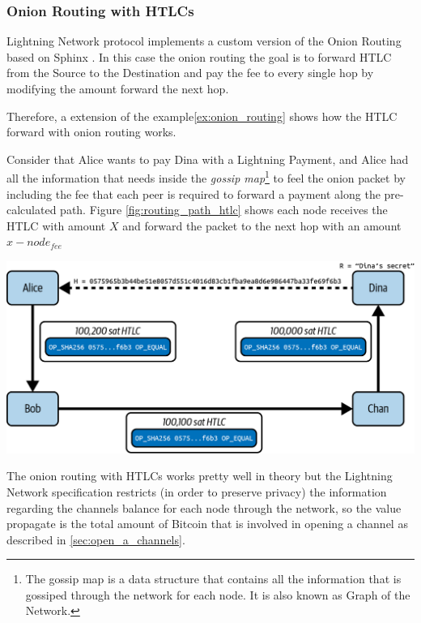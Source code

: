 \subsubsection{Onion Routing with HTLCs}

Lightning Network protocol implements a custom version of the Onion Routing based on Sphinx \cite{cryptoeprint:2008/475}. In this case the onion routing
the goal is to forward HTLC from the Source to the Destination and pay the fee to
every single hop by modifying the amount forward the next hop.

Therefore, a extension of the example\ref{ex:onion_routing} shows how
the HTLC forward with onion routing works.

\begin{example}
  \label{ex:htl_onion_routing}
  Consider that Alice wants to pay Dina with a Lightning Payment, and Alice had all the
  information that needs inside the \emph{gossip map}\footnote{The gossip map is a data structure that contains all the information that is gossiped through the network for each node. It is also known as Graph of the Network.} to feel the
  onion packet by including the fee that each peer is required to forward a payment
  along the pre-calculated path. Figure \ref{fig:routing_path_htlc} shows each node receives the HTLC with
  amount $X$ and forward the packet to the next hop with an amount $x - node_{fee}$

  {\centering
      \includegraphics[width=0.6\columnwidth]{imgs/mtln_1008.png}
  \par}  
\end{example}

The onion routing with HTLCs works pretty well in theory but the Lightning Network
specification restricts (in order to preserve privacy) the information regarding
the channels balance for each node through the network, so the value
propagate is the total amount of Bitcoin that is involved in opening a channel as described in \ref{sec:open_a_channels}.

